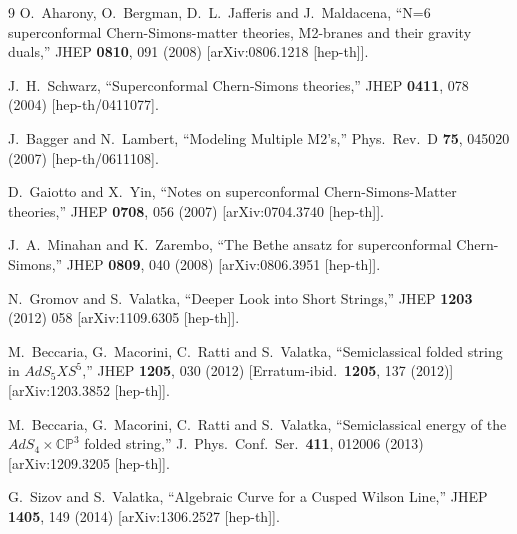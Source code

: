 \documentclass[a4paper,11pt]{article}
\numberwithin{equation}{section}
\begin{document}
\begin{thebibliography} {9}
  O.~Aharony, O.~Bergman, D.~L.~Jafferis and J.~Maldacena,
  ``N=6 superconformal Chern-Simons-matter theories, M2-branes and their gravity duals,''
  JHEP {\bf 0810}, 091 (2008)
  [arXiv:0806.1218 [hep-th]].

  J.~H.~Schwarz,
  ``Superconformal Chern-Simons theories,''
  JHEP {\bf 0411}, 078 (2004)
  [hep-th/0411077].

  J.~Bagger and N.~Lambert,
  ``Modeling Multiple M2's,''
  Phys.\ Rev.\ D {\bf 75}, 045020 (2007)
  [hep-th/0611108].

  D.~Gaiotto and X.~Yin,
  ``Notes on superconformal Chern-Simons-Matter theories,''
  JHEP {\bf 0708}, 056 (2007)
  [arXiv:0704.3740 [hep-th]].

  J.~A.~Minahan and K.~Zarembo,
  ``The Bethe ansatz for superconformal Chern-Simons,''
  JHEP {\bf 0809}, 040 (2008)
  [arXiv:0806.3951 [hep-th]].

  N.~Gromov and S.~Valatka,
  ``Deeper Look into Short Strings,''
  JHEP {\bf 1203} (2012) 058
  [arXiv:1109.6305 [hep-th]].

  M.~Beccaria, G.~Macorini, C.~Ratti and S.~Valatka,
  ``Semiclassical folded string in $AdS_5 X S^5$,''
  JHEP {\bf 1205}, 030 (2012)
  [Erratum-ibid.\  {\bf 1205}, 137 (2012)]
  [arXiv:1203.3852 [hep-th]].

  M.~Beccaria, G.~Macorini, C.~Ratti and S.~Valatka,
  ``Semiclassical energy of the $AdS_4 \times \mathbb{CP}^3$ folded string,''
  J.\ Phys.\ Conf.\ Ser.\  {\bf 411}, 012006 (2013)
  [arXiv:1209.3205 [hep-th]].

  G.~Sizov and S.~Valatka,
  ``Algebraic Curve for a Cusped Wilson Line,''
  JHEP {\bf 1405}, 149 (2014)
  [arXiv:1306.2527 [hep-th]].


\end{thebibliography}
\end{document}
